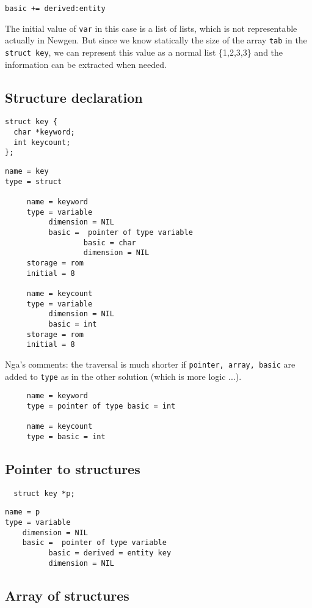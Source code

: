 \documentclass[a4paper]{report}
\begin{document}
\verb/basic += derived:entity/

The initial value of \verb/var/ in this case is a list of lists, which is
not representable actually in Newgen. But since we know statically the
size of the array \verb/tab/ in the \lstinline/struct key/, we can represent
this value as a normal list \{1,2,3,3\} and the information can be extracted
when needed. 

\subsection{Structure declaration}

\begin{lstlisting}
struct key {
  char *keyword;
  int keycount;
};
\end{lstlisting}

\begin{verbatim}
name = key
type = struct 

     name = keyword
     type = variable
          dimension = NIL
          basic =  pointer of type variable
                  basic = char
                  dimension = NIL
     storage = rom
     initial = 8

     name = keycount
     type = variable
          dimension = NIL
          basic = int
     storage = rom
     initial = 8
\end{verbatim}
Nga's comments: the traversal is much shorter if 
\verb/pointer, array, basic/ are added to \verb/type/ as in the other
solution (which is more logic ...).
\begin{verbatim}
     name = keyword
     type = pointer of type basic = int

     name = keycount
     type = basic = int
\end{verbatim}

\subsection{Pointer to structures}

\begin{lstlisting}
  struct key *p;
\end{lstlisting}

\begin{verbatim}
name = p
type = variable
    dimension = NIL
    basic =  pointer of type variable
          basic = derived = entity key
          dimension = NIL
\end{verbatim}

\subsection{Array of structures}
\end{document}
